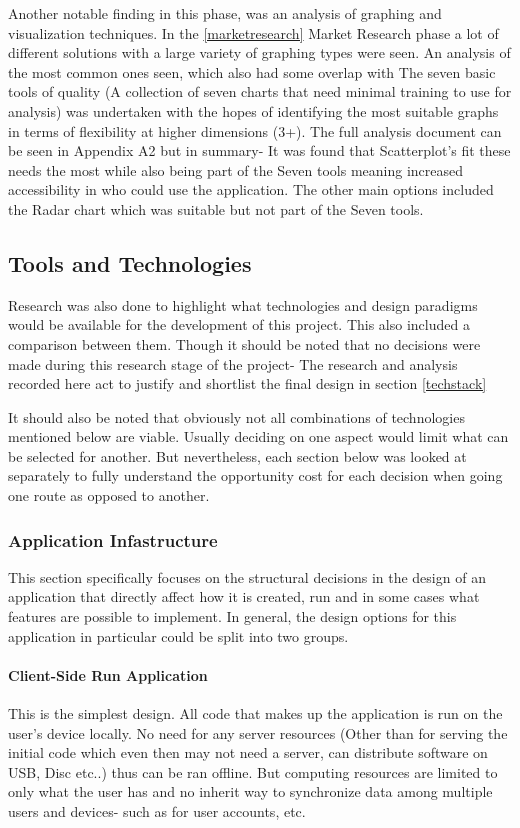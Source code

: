 Another notable finding in this phase, was an analysis of graphing and visualization techniques. In the \ref{marketresearch} Market Research phase a lot of different solutions with a large variety of graphing types were seen. An analysis of the most common ones seen, which also had some overlap with The seven basic tools of quality (A collection of seven charts that need minimal training to use \cite[]{ishikawa_1985_what} for analysis) was undertaken with the hopes of identifying the most suitable graphs in terms of flexibility at higher dimensions (3+). The full analysis document can be seen in Appendix A2 but in summary- It was found that Scatterplot's fit these needs the most while also being part of the Seven tools meaning increased accessibility in who could use the application. The other main options included the Radar chart which was suitable but not part of the Seven tools.

\subsection{Tools and Technologies} \label{toolsntech}
Research was also done to highlight what technologies and design paradigms would be available for the development of this project. This also included a comparison between them. Though it should be noted that no decisions were made during this research stage of the project- The research and analysis recorded here act to justify and shortlist the final design in section \ref{techstack}

It should also be noted that obviously not all combinations of technologies mentioned below are viable. Usually deciding on one aspect would limit what can be selected for another. But nevertheless, each section below was looked at separately to fully understand the opportunity cost for each decision when going one route as opposed to another.

\subsubsection{Application Infastructure}
This section specifically focuses on the structural decisions in the design of an application that directly affect how it is created, run and in some cases what features are possible to implement. In general, the design options for this application in particular could be split into two groups.

\paragraph{Client-Side Run Application}
This is the simplest design. All code that makes up the application is run on the user’s device locally. No need for any server resources (Other than for serving the initial code which even then may not need a server, can distribute software on USB, Disc etc..) thus can be ran offline. But computing resources are limited to only what the user has and no inherit way to synchronize data among multiple users and devices- such as for user accounts, etc.

